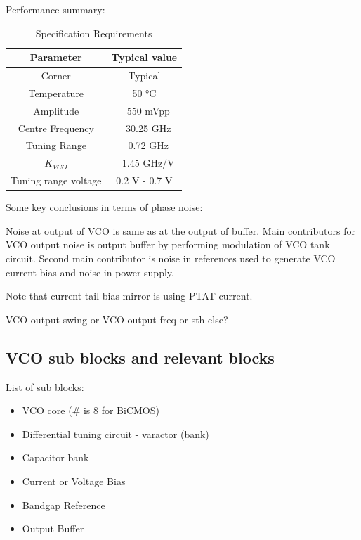 Performance summary:
\begin{table}[ht]
	\centering
	\begin{tabular}{|c|c|}
		\hline
		Parameter & Typical value \\
		\hline
		Corner & Typical \\
		\hline
		Temperature & 50 °C \\
		\hline
		Amplitude & ~ 550 mVpp \\
		\hline
		Centre Frequency & ~ 30.25 GHz \\
		\hline
		Tuning Range & ~ 0.72 GHz \\
		\hline
		$K_{VCO}$ & ~ 1.45 GHz/V \\
		\hline
		Tuning range voltage & 0.2 V - 0.7 V \\
		\hline
	\end{tabular}
	\label{30GHz-VCO-design}
	\caption{Specification Requirements} 
\end{table}

Some key conclusions in terms of phase noise:

Noise at output of VCO is same as at the output of buffer. Main contributors for VCO output noise is output buffer by performing modulation of VCO tank circuit. Second main contributor is noise in references used to generate VCO current bias and noise in power supply.

Note that current tail bias mirror is using PTAT current.

\begin{question}
	VCO output swing or VCO output freq or sth else?
\end{question}


\subsection{VCO sub blocks and relevant blocks}

List of sub blocks:

\begin{itemize}
	\item VCO core (\# is 8 for BiCMOS)
	\item Differential tuning circuit - varactor (bank)
	\item Capacitor bank
	\item Current or Voltage Bias
	\item Bandgap Reference
	\item Output Buffer
\end{itemize}


